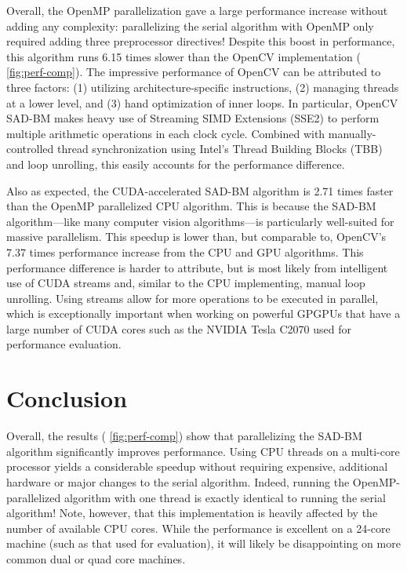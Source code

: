 \documentclass{article}
\let\orgautoref\autoref
\providecommand{\Cref}
        {\def\equationautorefname{Equation}%
         \def\figureautorefname{Figure}%
         \def\subfigureautorefname{Figure}%
         \def\Itemautorefname{Item}%
         \def\tableautorefname{Table}%
         \def\sectionautorefname{Section}%
         \def\subsectionautorefname{Section}%
         \def\subsubsectionautorefname{Section}%
         \def\chapterautorefname{Section}%
         \def\partautorefname{Part}%
         \orgautoref}
\begin{document}
Overall, the OpenMP parallelization gave a large performance increase without
adding any complexity: parallelizing the serial algorithm with OpenMP only
required adding three preprocessor directives! Despite this boost in
performance, this algorithm runs 6.15 times slower than the OpenCV
implementation (\Cref{fig:perf-comp}). The impressive performance of OpenCV can
be attributed to three factors: (1) utilizing architecture-specific
instructions, (2) managing threads at a lower level, and (3) hand optimization
of inner loops.  In particular, OpenCV SAD-BM makes heavy use of Streaming SIMD
Extensions (SSE2) to perform multiple arithmetic operations in each clock
cycle. Combined with manually-controlled thread synchronization using Intel's
Thread Building Blocks (TBB) and loop unrolling, this easily accounts for the
performance difference.

Also as expected, the CUDA-accelerated SAD-BM algorithm is 2.71 times faster
than the OpenMP parallelized CPU algorithm. This is because the SAD-BM
algorithm---like many computer vision algorithms---is particularly well-suited
for massive parallelism. This speedup is lower than, but comparable to,
OpenCV's 7.37 times performance increase from the CPU and GPU algorithms. This
performance difference is harder to attribute, but is most likely from
intelligent use of CUDA streams and, similar to the CPU implementing, manual
loop unrolling. Using streams allow for more operations to be executed in
parallel, which is exceptionally important when working on powerful GPGPUs that
have a large number of CUDA cores such as the NVIDIA Tesla C2070 used for
performance evaluation.

\section{Conclusion}
\label{sec:conc}
Overall, the results (\Cref{fig:perf-comp}) show that parallelizing the SAD-BM
algorithm significantly improves performance. Using CPU threads on a multi-core
processor yields a considerable speedup without requiring expensive, additional
hardware or major changes to the serial algorithm. Indeed, running the
OpenMP-parallelized algorithm with one thread is exactly identical to running
the serial algorithm! Note, however, that this implementation is heavily
affected by the number of available CPU cores. While the performance is
excellent on a 24-core machine (such as that used for evaluation), it will
likely be disappointing on more common dual or quad core machines.
\end{document}
